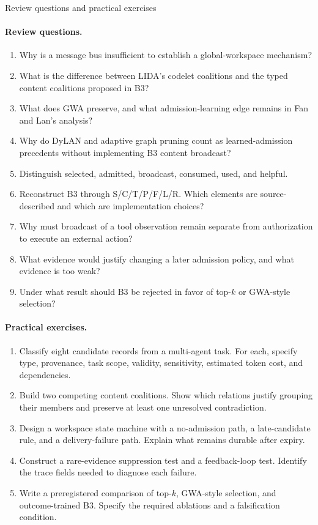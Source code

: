 \begin{reviewquestions}{Review questions and practical exercises}
\paragraph{Review questions.}
\begin{enumerate}
  \item Why is a message bus insufficient to establish a global-workspace mechanism?
  \item What is the difference between LIDA's codelet coalitions and the typed content coalitions proposed in B3?
  \item What does GWA preserve, and what admission-learning edge remains in Fan and Lan's analysis?
  \item Why do DyLAN and adaptive graph pruning count as learned-admission precedents without implementing B3 content broadcast?
  \item Distinguish selected, admitted, broadcast, consumed, used, and helpful.
  \item Reconstruct B3 through S/C/T/P/F/L/R. Which elements are source-described and which are implementation choices?
  \item Why must broadcast of a tool observation remain separate from authorization to execute an external action?
  \item What evidence would justify changing a later admission policy, and what evidence is too weak?
  \item Under what result should B3 be rejected in favor of top-$k$ or GWA-style selection?
\end{enumerate}
\paragraph{Practical exercises.}
\begin{enumerate}
  \item Classify eight candidate records from a multi-agent task. For each, specify type, provenance, task scope, validity, sensitivity, estimated token cost, and dependencies.
  \item Build two competing content coalitions. Show which relations justify grouping their members and preserve at least one unresolved contradiction.
  \item Design a workspace state machine with a no-admission path, a late-candidate rule, and a delivery-failure path. Explain what remains durable after expiry.
  \item Construct a rare-evidence suppression test and a feedback-loop test. Identify the trace fields needed to diagnose each failure.
  \item Write a preregistered comparison of top-$k$, GWA-style selection, and outcome-trained B3. Specify the required ablations and a falsification condition.
\end{enumerate}
\end{reviewquestions}

